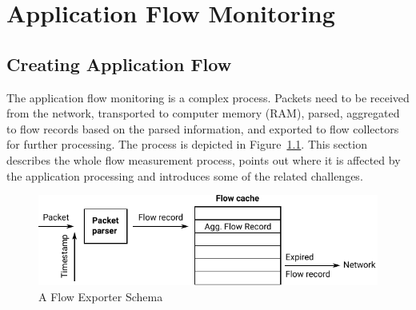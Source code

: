 \chapter{Application Flow Monitoring}




\section{Creating Application Flow}



The application flow monitoring is a complex process. Packets need to be received from the network, transported to computer memory (RAM), parsed, aggregated to flow records based on the parsed information, and exported to flow collectors for further processing. The process is depicted in Figure~\ref{fig:flow-exporter-schema}. This section describes the whole flow measurement process, points out where it is affected by the application processing and introduces some of the related challenges.

\begin{figure}[t!]
  \begin{center}
    \includegraphics[width=\textwidth]{figures/flow-exporter-schema}
  \end{center}
  \caption{A Flow Exporter Schema}
  \label{fig:flow-exporter-schema}
\end{figure}

